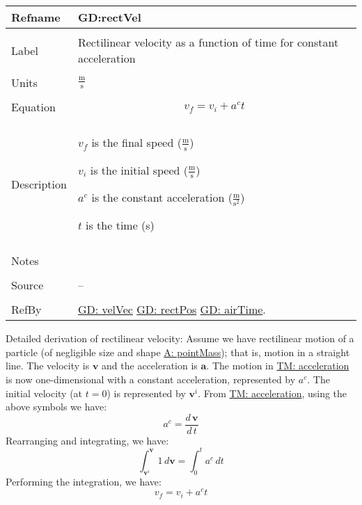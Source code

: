 \documentclass[12pt]{article}
\begin{document}
\noindent \begin{minipage}{\textwidth}
\begin{tabular}{p{} p{}}
\toprule \textbf{Refname} & \textbf{GD:rectVel}
\label{GD:rectVel}
\\ \midrule \\
Label & Rectilinear velocity as a function of time for constant acceleration
\\ \midrule \\
Units & $\frac{\text{m}}{\text{s}}$
\\ \midrule \\
Equation & \begin{displaymath}
           {v_{f}}={v_{i}}+{a^{c}} t
           \end{displaymath}
\\ \midrule \\
Description & \begin{symbDescription}
              \item{${v_{f}}$ is the final speed ($\frac{\text{m}}{\text{s}}$)}
              \item{${v_{i}}$ is the initial speed ($\frac{\text{m}}{\text{s}}$)}
              \item{${a^{c}}$ is the constant acceleration ($\frac{\text{m}}{\text{s}^{2}}$)}
              \item{$t$ is the time (s)}
              \end{symbDescription}
\\ \midrule \\
Notes & 
\\ \midrule \\
Source & --
\\ \midrule \\
RefBy & \hyperref[GD:velVec]{GD: velVec} \hyperref[GD:rectPos]{GD: rectPos} \hyperref[GD:airTime]{GD: airTime}.
\\ \bottomrule \end{tabular}
\end{minipage}
Detailed derivation of rectilinear velocity:
Assume we have rectilinear motion of a particle (of negligible size and shape \hyperref[pointMass]{A: pointMass}); that is, motion in a straight line. The velocity is $\mathbf{v}$ and the acceleration is $\mathbf{a}$. The motion in \hyperref[TM:acceleration]{TM: acceleration} is now one-dimensional with a constant acceleration, represented by ${a^{c}}$. The initial velocity (at $t=0$) is represented by ${\mathbf{v}^{i}}$. From \hyperref[TM:acceleration]{TM: acceleration}, using the above symbols we have:
\begin{displaymath}
{a^{c}}=\frac{d\,\mathbf{v}}{d\,t}
\end{displaymath}
Rearranging and integrating, we have:
\begin{displaymath}
\int_{{\mathbf{v}^{i}}}^{\mathbf{v}}{1}\,d\mathbf{v}=\int_{0}^{t}{{a^{c}}}\,dt
\end{displaymath}
Performing the integration, we have:
\begin{displaymath}
{v_{f}}={v_{i}}+{a^{c}} t
\end{displaymath}
\par~
\end{document}
